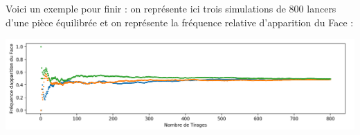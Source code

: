 \documentclass[a4paper,10pt]{report}
\begin{document}
\medskip

\noindent Voici un exemple pour finir : on représente ici trois simulations de 800 lancers d'une pièce équilibrée et on représente la fréquence relative d'apparition du Face :

\begin{center}
\includegraphics[scale=0.5]{Face}
\end{center}
\end{document}
